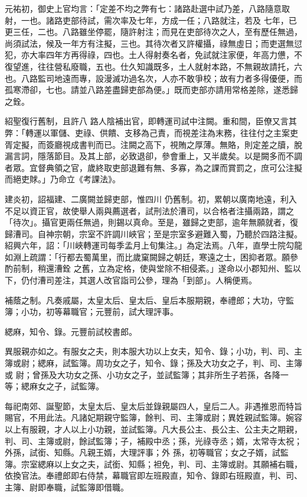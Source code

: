 \begin{pinyinscope}
 元祐初，御史上官均言：「定差不均之弊有七：諸路赴選中試乃差，八路隨意取射，一也。諸路吏部待試，需次率及七年，方成一任；八路就注，若及
 七年，已更三任，二也。八路雖坐停罷，隨許射注；而見在吏部待次之人，至有歷任無過，尚須試法，候及一年方有注擬，三也。其待次者又許權攝，祿無虛日；而吏選無愆犯，亦大率四年方再得祿，四也。土人得射奏名者，免試就注家便，年高力憊，不復望進，往往營私廢職，五也。仕久知識既多，土人就射本路，不無親故請托，六也。八路監司地遠而專，設漫滅功過名次，人亦不敢爭校；故有力者多得優便，而孤寒滯卻，七也。請並八路差盡歸吏部為便。」既而吏部亦請用常格差除，遂悉歸之銓。



 紹聖復行舊制，且許八
 路人陰補出官，即轉運司試中注闕。重和間，臣僚又言其弊：「轉運以軍儲、吏祿、供饋、支移為己責，而視差注為末務，往往付之主案吏胥定擬，而簽廳視成書判而已。注闕之高下，視賄之厚薄。無賂，則定差之牘，脫漏言詞，隱落節目。及其上部，必致退卻，參會重上，又半歲矣。以是闕多而不調者眾。宜督典領之官，歲終取吏部退難有無、多寡，為之課而賞罰之，庶可公注擬而絕吏賕。」乃命立《考課法》。



 建炎初，詔福建、二廣闕並歸吏部，惟四川
 仍舊制。初，累朝以廣南地遠，利入不足以資正官，故使舉人兩與薦選者，試刑法於漕司，以合格者注攝兩路，謂之「待次」。攝官更兩任無過，則錫以真命。至是，雖歸之吏部，逾年無願就者，復歸漕司。自神宗朝，宗室不許調川峽官；至是宗室多避難入蜀，乃聽於四路注擬。紹興六年，詔：「川峽轉運司每季孟月上旬集注。」為定法焉。八年，直學士院勾龍如淵上疏謂：「行都去蜀萬里，而比歲窠闕歸之朝廷，寒遠之士，困抑者眾。願參酌前制，稍還漕銓
 之舊，立為定格，使與堂除不相侵紊。」遂命以小郡知州、監以下，仍付漕司差注，其選人改官詣司公參，理為「到部」。人稱便焉。



 補蔭之制。凡奏戚屬，太皇太后、皇太后、皇后本服期親，奉禮郎；大功，守監簿；小功，初等幕職官；元豐前，試大理評事。



 緦麻，知令、錄。元豐前試校書郎。



 異服親亦如之。有服女之夫，則本服大功以上女夫，知令、錄；小功，判、司、主簿或尉；緦麻，試監簿。周功女之子，知令、錄；孫及大功女之子，判、司、主簿或
 尉；曾孫及大功女之孫、小功女之子，並試監簿；其非所生子若孫，各降一等；緦麻女之子，試監簿。



 每祀南郊、誕聖節，太皇太后、皇太后並錄親屬四人，皇后二人。非遇推恩而特旨賜官，不用此法。凡諸妃期親守監簿，餘判、司、主簿或尉；異姓親試監簿。婉容以上有服親，才人以上小功親，並試監簿。凡大長公主、長公主、公主夫之期親，判、司、主簿或尉，餘試監簿；子，補殿中丞；孫，光祿寺丞；婿，太常寺太祝；外孫，試銜、知縣。凡親王婿，大理評事；外
 孫，初等職官；女之子婿，試監簿。宗室緦麻以上女之夫，試銜、知縣；袒免，判、司、主簿或尉。其願補右職，依換官法。奉禮郎即右侍禁，幕職官即左班殿直，知令、錄即右班殿直，判、司、主簿、尉即奉職，試監簿即借職。




\end{pinyinscope}
